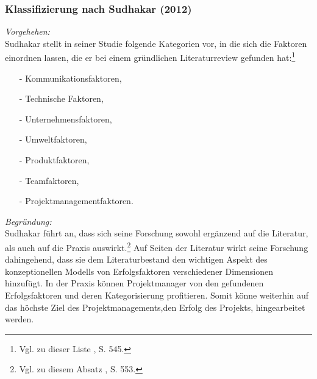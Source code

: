 \noindent
\subsubsection{Klassifizierung nach Sudhakar (2012)}
\textit{Vorgehehen:}\\\noindent
Sudhakar stellt in seiner Studie folgende Kategorien vor, in die sich die Faktoren einordnen lassen, die er bei einem gründlichen
Literaturreview gefunden hat:\footnote{Vgl. zu dieser Liste \cite{Sudhakar.2012}, S. 545.}
\begin{itemize}\itemsep0pt
\item[-]Kommunikationsfaktoren,
\item[-]Technische Faktoren,
\item[-]Unternehmensfaktoren,
\item[-]{Umweltfaktoren,}
\item[-]{Produktfaktoren,}
\item[-]{Teamfaktoren,}
\item[-]{Projektmanagementfaktoren.}
\end{itemize}
\textit{Begründung:}\\\noindent
Sudhakar führt an, dass sich seine Forschung sowohl ergänzend auf die Literatur, als auch auf die Praxis auswirkt.\footnote{Vgl. zu diesem Absatz \cite{Sudhakar.2012}, S. 553.}
Auf Seiten der Literatur wirkt seine Forschung dahingehend, dass sie dem Literaturbestand den wichtigen Aspekt des 
konzeptionellen Modells von Erfolgsfaktoren verschiedener Dimensionen hinzufügt.
In der Praxis können Projektmanager von den gefundenen Erfolgsfaktoren und deren Kategorisierung profitieren.
Somit könne weiterhin auf das höchste Ziel des Projektmanagements,den Erfolg des Projekts, hingearbeitet werden.



